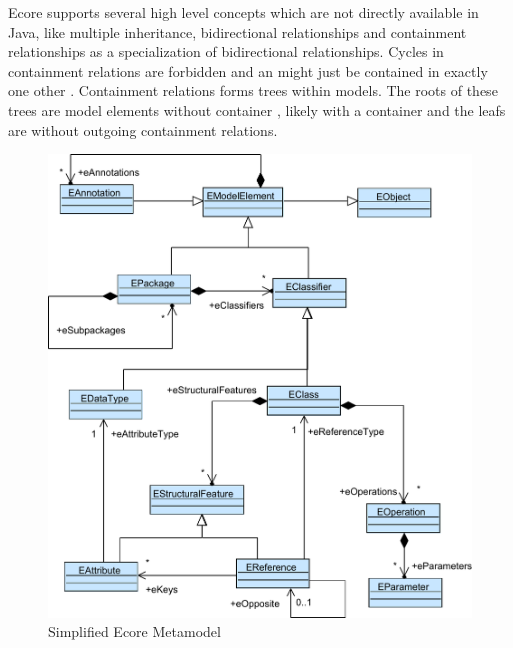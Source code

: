Ecore supports several high level concepts which are not directly available in Java, like multiple inheritance, bidirectional relationships and containment relationships as a specialization of bidirectional relationships. Cycles in containment relations are forbidden and an  might just be contained in exactly one other . Containment relations forms trees within models. The roots of these trees are model elements without container , likely with a container  and the leafs are  without outgoing containment relations.  

\begin{figure}
\centering
\includegraphics[scale=0.9]{gfx/ex/Ecore} 
\caption{Simplified Ecore Metamodel}
\label{MM:Ecore}
\end{figure}
	
